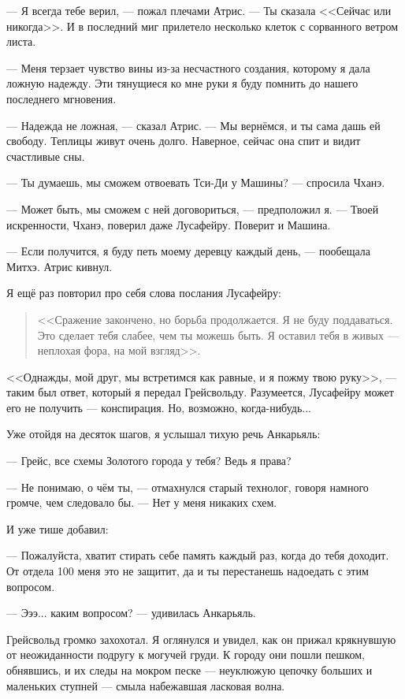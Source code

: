 --- Я всегда тебе верил, --- пожал плечами Атрис.
--- Ты сказала <<Сейчас или никогда>>.
И в последний миг прилетело несколько клеток с сорванного ветром листа.

--- Меня терзает чувство вины из-за несчастного создания, которому я дала ложную надежду.
Эти тянущиеся ко мне руки я буду помнить до нашего последнего мгновения.

--- Надежда не ложная, --- сказал Атрис.
--- Мы вернёмся, и ты сама дашь ей свободу.
Теплицы живут очень долго.
Наверное, сейчас она спит и видит счастливые сны.

--- Ты думаешь, мы сможем отвоевать Тси-Ди у Машины? --- спросила Чханэ.

--- Может быть, мы сможем с ней договориться, --- предположил я.
--- Твоей искренности, Чханэ, поверил даже Лусафейру.
Поверит и Машина.

--- Если получится, я буду петь моему деревцу каждый день, --- пообещала Митхэ.
Атрис кивнул.

Я ещё раз повторил про себя слова послания Лусафейру:

\begin{quote}
<<Сражение закончено, но борьба продолжается.
Я не буду поддаваться.
Это сделает тебя слабее, чем ты можешь быть.
Я оставил тебя в живых --- неплохая фора, на мой взгляд>>.
\end{quote}

<<Однажды, мой друг, мы встретимся как равные, и я пожму твою руку>>, --- таким был ответ, который я передал Грейсвольду.
Разумеется, Лусафейру может его не получить --- конспирация.
Но, возможно, когда-нибудь...

Уже отойдя на десяток шагов, я услышал тихую речь Анкарьяль:

--- Грейс, все схемы Золотого города у тебя?
Ведь я права?

--- Не понимаю, о чём ты, --- отмахнулся старый технолог, говоря намного громче, чем следовало бы.
--- Нет у меня никаких схем.

И уже тише добавил:

--- Пожалуйста, хватит стирать себе память каждый раз, когда до тебя доходит.
От отдела 100 меня это не защитит, да и ты перестанешь надоедать с этим вопросом.

--- Эээ... каким вопросом? --- удивилась Анкарьяль.

Грейсвольд громко захохотал.
Я оглянулся и увидел, как он прижал крякнувшую от неожиданности подругу к могучей груди.
К городу они пошли пешком, обнявшись, и их следы на мокром песке --- неуклюжую цепочку больших и маленьких ступней --- смыла набежавшая ласковая волна.


